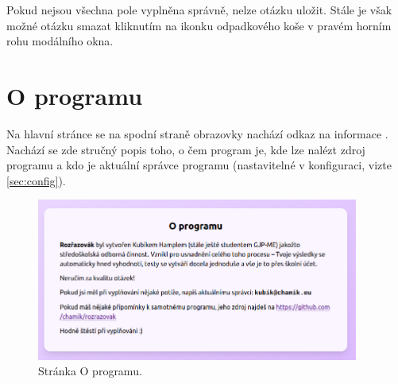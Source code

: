 Pokud nejsou všechna pole vyplněna správně, nelze otázku uložit. Stále je však možné otázku smazat kliknutím na ikonku odpadkového koše v pravém horním rohu modálního okna.

\section{O programu}

Na hlavní stránce se na spodní straně obrazovky nachází odkaz na informace . Nachází se zde stručný popis toho, o čem program je, kde lze nalézt zdroj programu a kdo je aktuální správce programu (nastavitelné v konfiguraci, vizte \ref{sec:config}).

\begin{figure}[H]
    \centering
    \includegraphics[width=400px]{images/01design/about.png}
    \caption{Stránka O programu.}
\end{figure}
